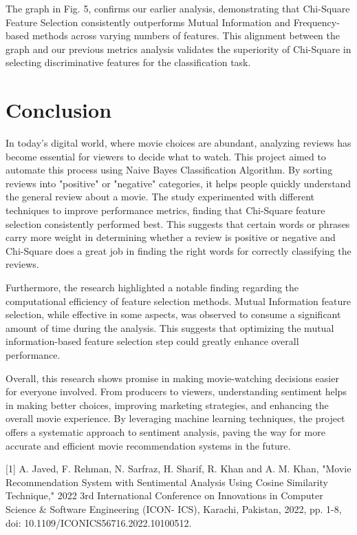 \documentclass[acmlarge,nonacm,12pt]{acmart}
\begin{document}
The graph in Fig. 5, confirms our earlier analysis, demonstrating that Chi-Square Feature Selection consistently outperforms Mutual Information and Frequency-based methods across varying numbers of features. This alignment between the graph and our previous metrics analysis validates the superiority of Chi-Square in selecting discriminative features for the classification task.

\section{Conclusion}

In today's digital world, where movie choices are abundant, analyzing reviews has become essential for viewers to decide what to watch. This project aimed to automate this process using Naive Bayes Classification Algorithm. By sorting reviews into "positive" or "negative" categories, it helps people quickly understand the general review about a movie. The study experimented with different techniques to improve performance metrics, finding that Chi-Square feature selection consistently performed best. This suggests that certain words or phrases carry more weight in determining whether a review is positive or negative and Chi-Square does a great job in finding the right words for correctly classifying the reviews.

Furthermore, the research highlighted a notable finding regarding the computational efficiency of feature selection methods. Mutual Information feature selection, while effective in some aspects, was observed to consume a significant amount of time during the analysis. This suggests that optimizing the mutual information-based feature selection step could greatly enhance overall performance. 

Overall, this research shows promise in making movie-watching decisions easier for everyone involved. From producers to viewers, understanding sentiment helps in making better choices, improving marketing strategies, and enhancing the overall movie experience. By leveraging machine learning techniques, the project offers a systematic approach to sentiment analysis, paving the way for more accurate and efficient movie recommendation systems in the future.




[1] A. Javed, F. Rehman, N. Sarfraz, H. Sharif, R. Khan and A. M. Khan, "Movie Recommendation System with Sentimental Analysis Using Cosine Similarity Technique," 2022 3rd International Conference on Innovations in Computer Science \& Software Engineering (ICON- ICS), Karachi, Pakistan, 2022, pp. 1-8, doi:  10.1109/ICONICS56716.2022.10100512.
\end{document}
